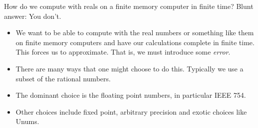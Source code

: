 \documentclass{beamer}
\begin{document}



\begin{frame}{How do we compute with reals on a finite memory computer in finite time?}
Blunt answer: You don't.
\begin{itemize}
\item We want to be able to compute with the real numbers or something like them on finite memory computers and 
have our calculations complete in finite time. This forces us to approximate. That is, we must introduce
some \emph{error}. \\
\item There are many ways that one might choose to do this. Typically we use a subset of
the rational numbers. \\
\item The dominant choice is the floating point numbers, in particular IEEE 754. \\
\item Other choices include fixed point, arbitrary precision and exotic choices like Unums.
\end{itemize}
\end{frame}

\end{document}
